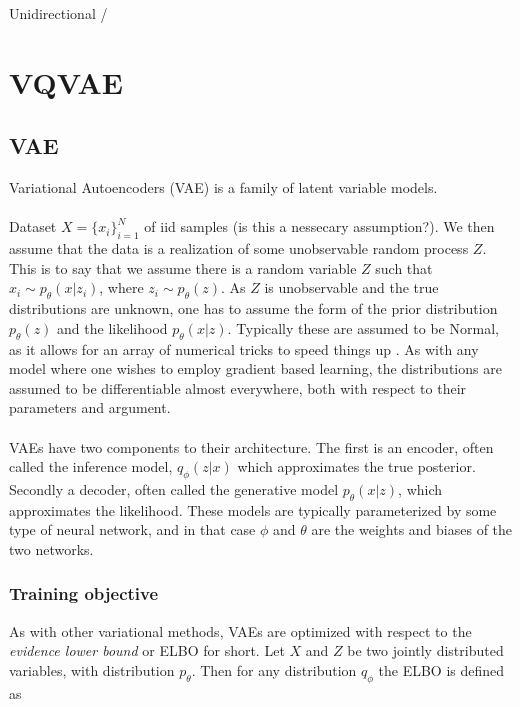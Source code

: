 \documentclass[../../thesis.tex]{subfiles}
\begin{document}
Unidirectional / 




\section{VQVAE}

\subsection{VAE}
Variational Autoencoders (VAE) is a family of latent variable models. 
\\\\

Dataset $X = \{x_i\}_{i=1}^{N}$ of iid samples (is this a nessecary assumption?). We then assume that the data is a realization of some unobservable random process $Z$. This is to say that we assume there is a random variable $Z$ such that $x_i \sim p_{\theta}(x|z_i)$, where $z_i \sim p_{\theta}(z)$. As $Z$ is unobservable and the true distributions are unknown, one has to assume the form of the prior distribution $p_{\theta}(z)$ and the likelihood $p_{\theta}(x|z)$. Typically these are assumed to be Normal, as it allows for an array of numerical tricks to speed things up . As with any model where one wishes to employ gradient based learning, the distributions are assumed to be differentiable almost everywhere, both with respect to their parameters and argument. \\\\
VAEs have two components to their architecture. The first is an encoder, often called the inference model, $q_\phi(z|x)$ which approximates the true posterior. Secondly a decoder, often called the generative model $p_\theta(x|z)$, which approximates the likelihood. These models are typically parameterized by some type of neural network, and in that case $\phi$ and $\theta$ are the weights and biases of the two networks. 

\subsubsection{Training objective}

As with other variational methods, VAEs are optimized with respect to the \textit{evidence lower bound} or ELBO for short. Let $X$ and $Z$ be two jointly distributed variables, with distribution $p_\theta$. Then for any distribution $q_\phi$ the ELBO is defined as
\end{document}
